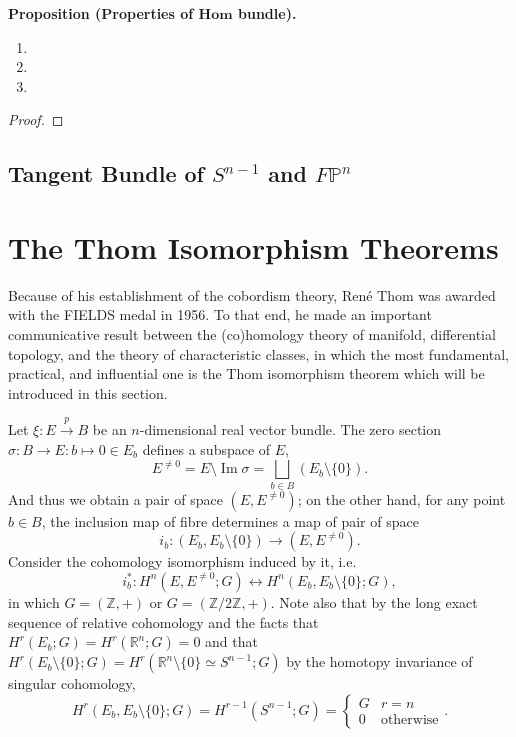 \documentclass[10pt]{article}
\begin{document}
\colorbox{red!30}{\textbf{Proposition (Properties of $\mathbf{Hom}$ bundle).}} \begin{enumerate}
\item
\item
\item
\end{enumerate}
\begin{proof}

\end{proof}

\subsection{Tangent Bundle of $S^{n-1}$ and $F\mathbb{P}^n$}

\section{The Thom Isomorphism Theorems}

Because of his establishment of the cobordism theory, Ren\'e Thom was awarded with the FIELDS medal in 1956. To that end, he made an important communicative result between the (co)homology theory of manifold, differential topology, and the theory of characteristic classes, in which the most fundamental, practical, and influential one is the Thom isomorphism theorem which will be introduced in this section.

Let $\xi:E\overset{p}{\to}B$ be an $n$-dimensional real vector bundle. The zero section $\sigma:B\to E:b\mapsto0\in E_b$ defines a subspace of $E$,
$$E^{\neq0}=E\setminus\operatorname{Im}\sigma=\bigsqcup_{b\in B}(E_b\setminus\{0\}).$$
And thus we obtain a pair of space $(E,E^{\neq0})$; on the other hand, for any point $b\in B$, the inclusion map of fibre determines a map of pair of space
$$i_b:(E_b,E_b\setminus\{0\})\to(E,E^{\neq0}).$$
Consider the cohomology isomorphism induced by it, i.e.
$$i_b^*:H^n(E,E^{\neq0};G)\leftrightarrow H^n(E_b,E_b\setminus\{0\};G),$$
in which $G=(\mathbb{Z},+)$ or $G=(\mathbb{Z}/2\mathbb{Z},+)$.
Note also that by the long exact sequence of relative cohomology and the facts that $H^r(E_b;G)=H^r(\mathbb{R}^n;G)=0$ and that $H^r(E_b\setminus\{0\};G)=H^r(\mathbb{R}^n\setminus\{0\}\simeq S^{n-1};G)$ by the homotopy invariance of singular cohomology,
$$H^r(E_b,E_b\setminus\{0\};G)=H^{r-1}(S^{n-1};G)=\begin{cases}G&r=n\\0&\mbox{otherwise}\end{cases}.$$
\end{document}
